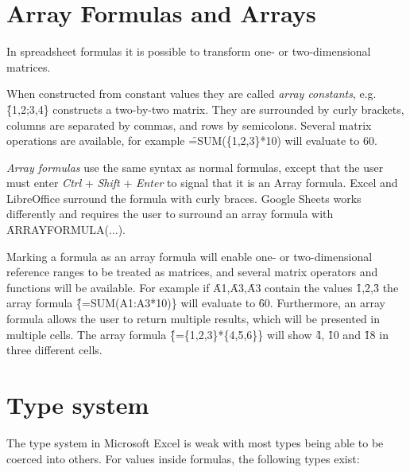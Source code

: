 \newpage

\section{Array Formulas and Arrays}
\label{sec:arrayformulas}
In spreadsheet formulas it is possible to transform one- or two-dimensional matrices.

When constructed from constant values they are called \emph{array constants}, e.g. \f{\{1,2;3,4\}} constructs a two-by-two matrix.
They are surrounded by curly brackets, columns are separated by commas, and rows by semicolons.
Several matrix operations are available, for example \f{=SUM(\{1,2,3\}*10)} will evaluate to 60.

\emph{Array formulas} use the same syntax as normal formulas, except that the user must enter \emph{Ctrl} + \emph{Shift} + \emph{Enter} to signal that it is an Array formula.
Excel and LibreOffice surround the formula with curly braces.
Google Sheets works differently and requires the user to surround an array formula with \f{ARRAYFORMULA($\ldots$)}.

Marking a formula as an array formula will enable one- or two-dimensional reference ranges to be treated as matrices, and several matrix operators and functions will be available. 
For example if \f{A1},\f{A3},\f{A3} contain the values \f{1},\f{2},\f{3} the array formula \f{\{=SUM(A1:A3*10)\}} will evaluate to \f{60}.
Furthermore, an array formula allows the user to return multiple results, which will be presented in multiple cells.
The array formula \f{\{=\{1,2,3\}*\{4,5,6\}\}} will show \f{4}, \f{10} and \f{18} in three different cells.

\section{Type system}

The type system in Microsoft Excel is weak with most types being able to be coerced into others.
For values inside formulas, the following types exist:

